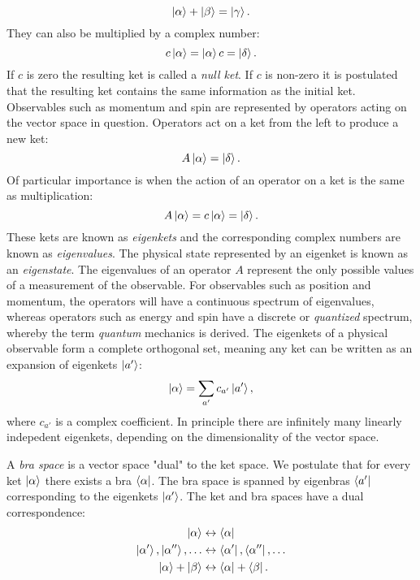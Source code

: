 \begin{equation}
\ket{\alpha} + \ket{\beta} = \ket{\gamma} .
\end{equation}
They can also be multiplied by a complex number:
\begin{equation}
c\ket{\alpha} = \ket{\alpha}c = \ket{\delta} .
\end{equation}
If $c$ is zero the resulting ket is called a \textit{null ket}.
If $c$ is non-zero it is postulated that the resulting ket contains
the same information as the initial ket.
\newline
Observables such as momentum and spin are represented by operators
acting on the vector space in question. Operators
act on a ket from the left to produce a new ket:
\begin{equation}
A \ket{\alpha} = \ket{\delta} .
\end{equation}
Of particular importance is when the action of an operator
on a ket is the same as multiplication:
\begin{equation}
A \ket{\alpha} = c\ket{\alpha} = \ket{\delta} .
\end{equation}
These kets are known as \textit{eigenkets} and the corresponding
complex numbers are known as \textit{eigenvalues}.
The physical state represented by an eigenket is known
as an \textit{eigenstate}.
The eigenvalues of an operator $A$ represent
the only possible values of a measurement of the observable.
For observables such as position and momentum, the operators
will have a continuous spectrum of eigenvalues, whereas
operators such as energy and spin have a discrete or
\textit{quantized} spectrum, whereby the term
\textit{quantum} mechanics is derived.
The eigenkets of a physical observable form
a complete orthogonal set, meaning any ket
can be written as an expansion of eigenkets $\ket{a'}$:
\begin{equation}
\ket{\alpha} = \sum_{a'} c_{a'} \ket{a'} ,
\end{equation}
where $c_{a'}$ is a complex coefficient.
In principle there are infinitely many linearly indepedent eigenkets,
depending on the dimensionality of the vector space.
\par
A \textit{bra space} is a vector space "dual" to the ket space.
We postulate that for every ket $\ket{\alpha}$ there exists a bra
$\bra{\alpha}$. The bra space is spanned by eigenbras $\bra{a'}$
corresponding to the eigenkets $\ket{a'}$. The ket and bra spaces
have a dual correspondence:
\begin{equation}
\begin{split}
\ket{\alpha} &\leftrightarrow \bra{\alpha} \\
\ket{\alpha '}, \ket{\alpha ''},\dots &\leftrightarrow \bra{\alpha '},
    \bra{\alpha ''},\dots \\
\ket{\alpha} + \ket{\beta} &\leftrightarrow \bra{\alpha} + \bra{\beta} .
\end{split}
\end{equation}
